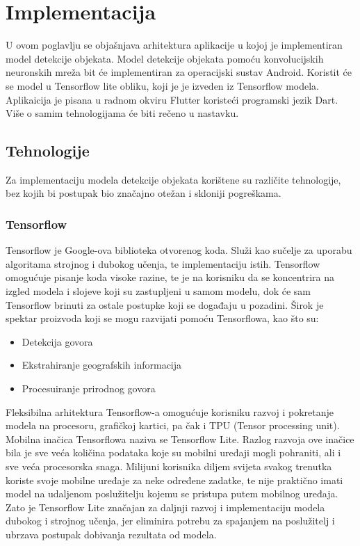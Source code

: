 \chapter{Implementacija}
U ovom poglavlju se objašnjava arhitektura aplikacije u kojoj je implementiran model detekcije objekata. 
Model detekcije objekata pomoću konvolucijskih neuronskih mreža bit će implementiran za 
operacijski sustav Android. Koristit će se model u Tensorflow lite obliku, koji je je izveden iz Tensorflow modela.
Aplikaicija je pisana u radnom okviru Flutter koristeći programski jezik Dart. 
Više o samim tehnologijama će biti rečeno u nastavku.

\section{Tehnologije}
Za implementaciju modela detekcije objekata korištene su različite tehnologije, bez kojih bi postupak bio značajno otežan i 
skloniji pogreškama.
\subsection{Tensorflow}
Tensorflow je Google-ova biblioteka otvorenog koda. Služi kao sučelje za uporabu algoritama strojnog i dubokog učenja, te implementaciju
istih. Tensorflow omogućuje pisanje koda visoke razine, te je na korisniku da se koncentrira na izgled modela i slojeve koji su zastupljeni u samom
modelu, dok će sam Tensorflow brinuti za ostale postupke koji se događaju u pozadini. Širok je spektar proizvoda koji se mogu razvijati pomoću
Tensorflowa, kao što su: 
\begin{itemize}
    \item Detekcija govora
    \item Ekstrahiranje geografskih informacija
    \item Procesuiranje prirodnog govora
\end{itemize}
Fleksibilna arhitektura Tensorflow-a omogućuje korisniku razvoj i pokretanje modela
na procesoru, grafičkoj kartici, pa čak i TPU (Tensor processing unit).
Mobilna inačica Tensorflowa naziva se Tensorflow Lite. 
Razlog razvoja ove inačice bila je sve veća količina podataka koje su mobilni uređaji 
mogli pohraniti, ali i sve veća procesorska snaga. Milijuni korisnika diljem svijeta svakog 
trenutka koriste svoje mobilne uređaje za neke određene zadatke, te nije praktično imati model na 
udaljenom poslužitelju kojemu se pristupa putem mobilnog uređaja. Zato je Tensorflow Lite značajan za daljnji razvoj i 
implementaciju modela dubokog i strojnog učenja, jer eliminira potrebu za spajanjem na poslužitelj i ubrzava postupak dobivanja
rezultata od modela. 

